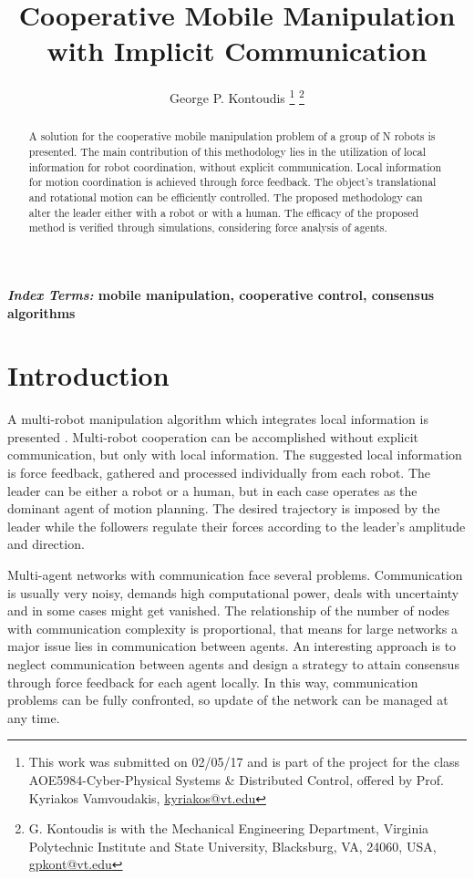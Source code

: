 \documentclass[letterpaper, 10 pt, conference]{ieeeconf}
\title{\LARGE \bf Cooperative Mobile Manipulation with Implicit Communication}
\author{George P. Kontoudis
\thanks{This work was submitted on 02/05/17 and is part of the project for the class AOE5984-Cyber-Physical Systems \& Distributed Control, offered by Prof. Kyriakos Vamvoudakis, \url{kyriakos@vt.edu}}
\thanks{G. Kontoudis is with the Mechanical Engineering Department, Virginia Polytechnic Institute and State University, Blacksburg, VA, 24060, USA, \url{gpkont@vt.edu}}}
\begin{document}
\maketitle
\thispagestyle{empty}
\pagestyle{empty}


\begin{abstract}
A solution for the cooperative mobile manipulation problem of a group of N robots is presented. The main contribution of this methodology lies in the utilization of local information for robot coordination, without explicit communication. Local information for motion coordination is achieved through force feedback. The object's translational and rotational motion can be efficiently controlled. The proposed methodology can alter the leader either with a robot or with a human. The efficacy of the proposed method is verified through simulations, considering force analysis of agents.   
\end{abstract}

\normalsize{\bf\small\emph{Index Terms:} mobile manipulation, cooperative control, consensus algorithms}  


\section{Introduction}\label{intro}

A multi-robot manipulation algorithm which integrates local information is presented \cite{wang2016force}. Multi-robot cooperation can be accomplished without explicit communication, but only with local information. The suggested local information is force feedback, gathered and processed individually from each robot. The leader can be either a robot or a human, but in each case operates as the dominant agent of motion planning. The desired trajectory is imposed by the leader while the followers regulate their forces according to the leader's amplitude and direction.   

Multi-agent networks with communication face several problems. Communication is usually very noisy, demands high computational power, deals with uncertainty and in some cases might get vanished. The relationship of the number of nodes with communication complexity is proportional, that means for large networks a major issue lies in communication between agents. An interesting approach is to neglect communication between agents and design a strategy to attain consensus through force feedback for each agent locally. In this way, communication problems can be fully confronted, so update of the network can be managed at any time. 
\end{document}
